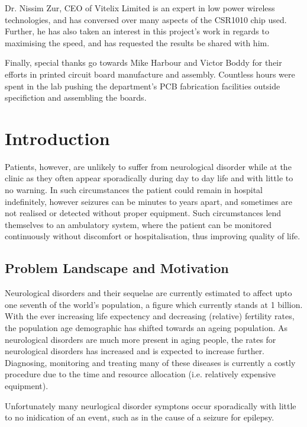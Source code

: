 \documentclass[]{article}
\begin{document}
Dr. Nissim Zur, CEO of Vitelix Limited is an expert in low power wireless technologies, and has conversed over many aspects of the CSR1010 chip used. Further, he has also taken an interest in this project's work in regards to maximising the speed, and has requested the results be shared with him.

Finally, special thanks go towards Mike Harbour and Victor Boddy for their efforts in printed circuit board manufacture and assembly. Countless hours were spent in the lab pushing the department's PCB fabrication facilities outside specifiction and assembling the boards. 

\clearpage

\section{Introduction}

Patients, however, are unlikely to suffer from neurological disorder while at the clinic as they often appear sporadically during day to day life and with little to no warning. In such circumstances the patient could remain in hospital indefinitely, however seizures can be minutes to years apart, and sometimes are not realised or detected without proper equipment. Such circumstances lend themselves to an ambulatory system, where the patient can be monitored continuously without discomfort or hospitalisation, thus improving quality of life. 

\subsection{Problem Landscape and Motivation}
Neurological disorders and their sequelae are currently estimated to affect upto one seventh of the world's population, a figure which currently stands at 1 billion. With the ever increasing life expectency and decreasing (relative) fertility rates, the population age demographic has shifted towards an ageing population. As neurological disorders are much more present in aging people, the rates for neurological disorders has increased and is expected to increase further. Diagnosing, monitoring and treating many of these diseases is currently a costly procedure due to the time and resource allocation (i.e. relatively expensive equipment).

Unfortunately many neurlogical disorder symptons occur sporadically with little to no inidication of an event, such as in the cause of a seizure for epilepsy.
\end{document}
